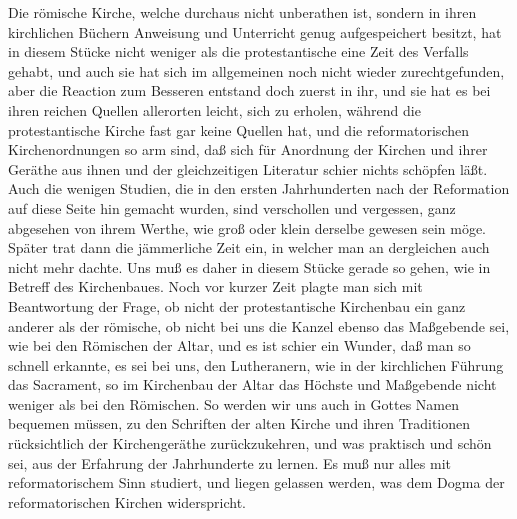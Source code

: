 Die römische Kirche, welche durchaus nicht unberathen ist, sondern in ihren kirchlichen Büchern Anweisung und Unterricht genug aufgespeichert besitzt, hat in diesem Stücke nicht weniger als die protestantische eine Zeit des Verfalls gehabt, und auch sie hat sich im allgemeinen noch nicht wieder zurechtgefunden, aber die Reaction zum Besseren entstand doch zuerst in ihr, und sie hat es bei ihren reichen Quellen allerorten leicht, sich zu erholen, während die protestantische Kirche fast gar keine Quellen hat, und die reformatorischen Kirchenordnungen so arm sind, daß sich für Anordnung der Kirchen und ihrer Geräthe aus ihnen und der gleichzeitigen Literatur schier nichts schöpfen läßt. Auch die wenigen Studien, die in den ersten Jahrhunderten nach der Reformation auf diese Seite hin gemacht wurden, sind verschollen und vergessen, ganz abgesehen von ihrem Werthe, wie groß oder klein derselbe gewesen sein möge. Später trat dann die jämmerliche Zeit ein, in welcher man an dergleichen auch nicht mehr dachte. Uns muß es daher
in diesem Stücke gerade so gehen, wie in Betreff des Kirchenbaues. Noch vor kurzer Zeit plagte man sich mit Beantwortung der Frage, ob nicht der protestantische Kirchenbau ein ganz anderer als der römische, ob nicht bei uns die Kanzel ebenso das Maßgebende sei, wie bei den Römischen der Altar, und es ist schier ein Wunder, daß man so schnell erkannte, es sei bei uns, den Lutheranern, wie in der kirchlichen Führung das Sacrament, so im Kirchenbau der Altar das Höchste und Maßgebende nicht weniger als bei den Römischen. So werden wir uns auch in Gottes Namen bequemen müssen, zu den Schriften der alten Kirche und ihren Traditionen rücksichtlich der Kirchengeräthe zurückzukehren, und was praktisch und schön sei, aus der Erfahrung der Jahrhunderte zu lernen. Es muß nur alles mit reformatorischem Sinn studiert, und liegen gelassen werden, was dem Dogma der reformatorischen Kirchen widerspricht.

